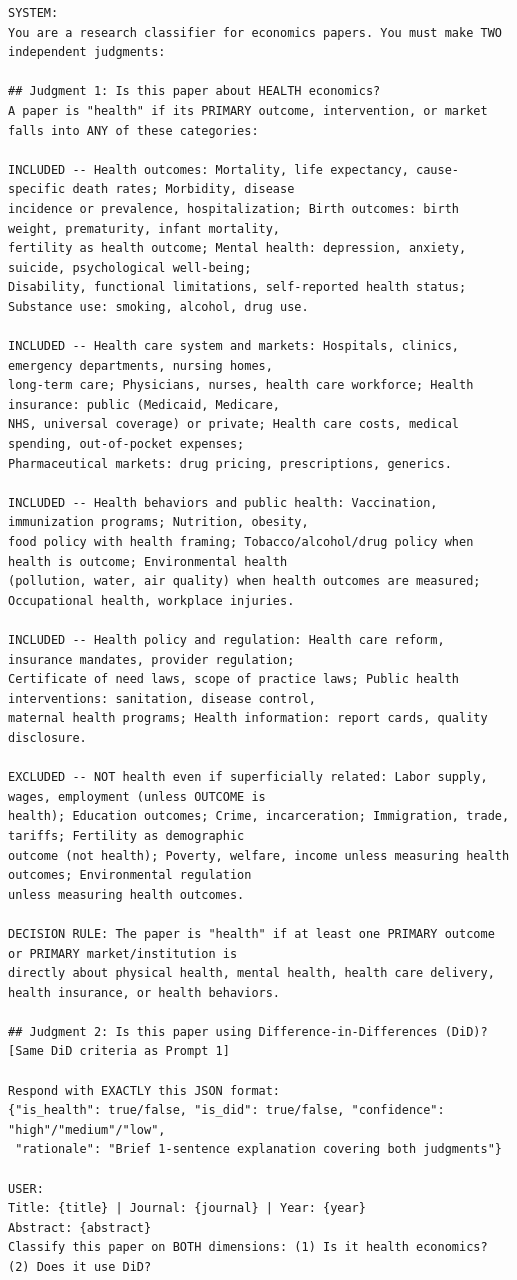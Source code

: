 \begin{tcolorbox}[colback=gray!5, colframe=gray!60, breakable]
\tiny
\begin{verbatim}
SYSTEM:
You are a research classifier for economics papers. You must make TWO independent judgments:

## Judgment 1: Is this paper about HEALTH economics?
A paper is "health" if its PRIMARY outcome, intervention, or market falls into ANY of these categories:

INCLUDED -- Health outcomes: Mortality, life expectancy, cause-specific death rates; Morbidity, disease
incidence or prevalence, hospitalization; Birth outcomes: birth weight, prematurity, infant mortality,
fertility as health outcome; Mental health: depression, anxiety, suicide, psychological well-being;
Disability, functional limitations, self-reported health status; Substance use: smoking, alcohol, drug use.

INCLUDED -- Health care system and markets: Hospitals, clinics, emergency departments, nursing homes,
long-term care; Physicians, nurses, health care workforce; Health insurance: public (Medicaid, Medicare,
NHS, universal coverage) or private; Health care costs, medical spending, out-of-pocket expenses;
Pharmaceutical markets: drug pricing, prescriptions, generics.

INCLUDED -- Health behaviors and public health: Vaccination, immunization programs; Nutrition, obesity,
food policy with health framing; Tobacco/alcohol/drug policy when health is outcome; Environmental health
(pollution, water, air quality) when health outcomes are measured; Occupational health, workplace injuries.

INCLUDED -- Health policy and regulation: Health care reform, insurance mandates, provider regulation;
Certificate of need laws, scope of practice laws; Public health interventions: sanitation, disease control,
maternal health programs; Health information: report cards, quality disclosure.

EXCLUDED -- NOT health even if superficially related: Labor supply, wages, employment (unless OUTCOME is
health); Education outcomes; Crime, incarceration; Immigration, trade, tariffs; Fertility as demographic
outcome (not health); Poverty, welfare, income unless measuring health outcomes; Environmental regulation
unless measuring health outcomes.

DECISION RULE: The paper is "health" if at least one PRIMARY outcome or PRIMARY market/institution is
directly about physical health, mental health, health care delivery, health insurance, or health behaviors.

## Judgment 2: Is this paper using Difference-in-Differences (DiD)?
[Same DiD criteria as Prompt 1]

Respond with EXACTLY this JSON format:
{"is_health": true/false, "is_did": true/false, "confidence": "high"/"medium"/"low",
 "rationale": "Brief 1-sentence explanation covering both judgments"}

USER:
Title: {title} | Journal: {journal} | Year: {year}
Abstract: {abstract}
Classify this paper on BOTH dimensions: (1) Is it health economics? (2) Does it use DiD?
\end{verbatim}
\end{tcolorbox}


